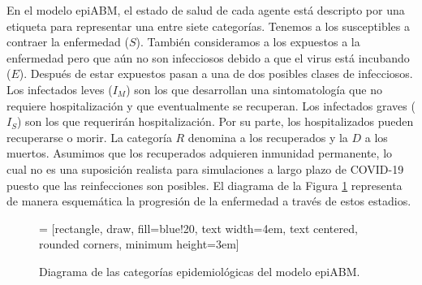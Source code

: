 En el modelo epiABM, el estado de salud de cada agente está descripto por una etiqueta para representar una entre siete categorías. Tenemos a los susceptibles a contraer la enfermedad ($S$). También consideramos a los expuestos a la enfermedad pero que aún no son infecciosos debido a que el virus está incubando ($E$). Después de estar expuestos pasan a una de dos posibles clases de infecciosos. Los infectados leves ($I_M$) son los que desarrollan una sintomatología que no requiere hospitalización y que eventualmente se recuperan. Los infectados graves ($I_S$) son los que requerirán hospitalización. Por su parte, los hospitalizados pueden recuperarse o morir. La categoría $R$ denomina a los recuperados y la $D$ a los muertos. Asumimos que los recuperados adquieren inmunidad permanente, lo cual no es una suposición realista para simulaciones a largo plazo de COVID-19 puesto que las reinfecciones son posibles. El diagrama de la Figura \ref{dia:epi_abm} representa de manera esquemática la progresión de la enfermedad a través de estos estadios.

\begin{figure}
    \begin{center}
         = [rectangle, draw, fill=blue!20, 
        text width=4em, text centered, rounded corners, minimum height=3em]
        \centering
    \end{center}
    \caption{Diagrama de las categorías epidemiológicas del modelo epiABM.}
    \label{dia:epi_abm}
\end{figure}

